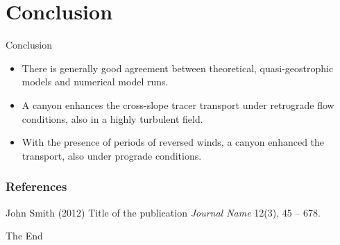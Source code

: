 \documentclass{beamer}
\begin{document}
\section{Conclusion}
\begin{frame}{Conclusion}
\begin{itemize}
    \item There is generally good agreement between theoretical, quasi-geostrophic models and numerical model runs.
    \item A canyon enhances the cross-slope tracer transport under retrograde flow conditions, also in a highly turbulent field.
    \item With the presence of periods of reversed winds, a canyon enhanced the transport, also under prograde conditions.
\end{itemize} 
\end{frame}





\begin{frame}
\frametitle{References}
\footnotesize{
\begin{thebibliography}{99} %
 John Smith (2012)
\newblock Title of the publication
\newblock \emph{Journal Name} 12(3), 45 -- 678.
\end{thebibliography}
}
\end{frame}


\begin{frame}
\Huge{\centerline{The End}}
\end{frame}



\end{document}
